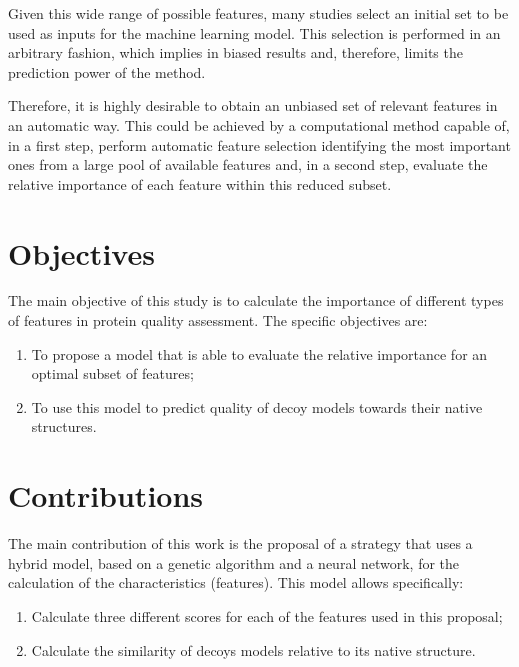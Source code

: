 Given this wide range of possible features, many studies select an initial set to be used as inputs for the machine learning model. This selection is performed in an arbitrary fashion, which implies in biased results and, therefore, limits the prediction power of the method.

Therefore, it is highly desirable to obtain an unbiased set of relevant features in an automatic way. This could be achieved by a computational method capable of, in a first step, perform automatic feature selection identifying the most important ones from a large pool of available features and, in a second step, evaluate the relative importance of each feature within this reduced subset.

\section{Objectives}
The main objective of this study is to calculate the importance of different types of features in protein quality assessment. The specific objectives are:

\begin{enumerate}[label=(\roman{*})]
  \item To propose a model that is able to evaluate the relative importance for an optimal subset of features;
  \item To use this model to predict quality of decoy models towards their native structures. 
\end{enumerate}

\section{Contributions}
The main contribution of this work is the proposal of a strategy that uses a hybrid model, based on a genetic algorithm and a neural network, for the calculation of the characteristics (features). This model allows specifically:
\begin{enumerate}[label=(\roman{*})]
	\item Calculate three different scores for each of the features used in this proposal;
	\item Calculate the similarity of decoys models relative to its native structure. 
\end{enumerate}

